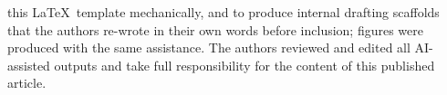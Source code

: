 \documentclass[referee,lineno,pdflatex,sn-vancouver-num]{sn-jnl}
\theoremstyle{thmstyleone}%
\theoremstyle{thmstyletwo}%
\theoremstyle{thmstylethree}%
\begin{document}
this \LaTeX\ template mechanically, and to produce internal drafting
scaffolds that the authors re-wrote in their own words before inclusion;
figures were produced with the same assistance. The authors reviewed and
edited all AI-assisted outputs and take full responsibility for the content
of this published article.
\end{document}
